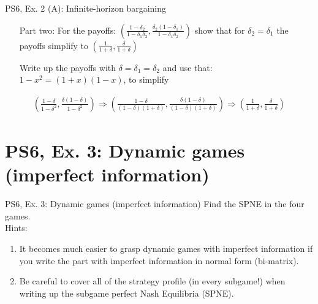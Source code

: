 \begin{frame}{PS6, Ex. 2 (A): Infinite-horizon bargaining}
    \begin{itemize}
    \item[Part two:] For the payoffs: $ \left( \frac{1-\delta_2}{1-\delta_1\delta_2},\frac{\delta_2(1-\delta_1)}{1-\delta_1\delta_2}\right)$ show that for $\delta_2=\delta_1$ the payoffs simplify to $\left(\frac{1}{1+\delta},\frac{\delta}{1+\delta}\right)$
    \end{itemize}
    \vfill\null
    \begin{itemize}
    \item[]Write up the payoffs with $\delta=\delta_1=\delta_2$ and use that: $1-x^2=(1+x)(1-x)$, to simplify \\
    \end{itemize}
    \vfill\null
    \begin{align*}
\left(\frac{1-\delta}{1-\delta^2},\frac{\delta(1-\delta)}{1-\delta^2}\right) \Rightarrow \left(\frac{1-\delta}{(1-\delta)(1+\delta)},\frac{\delta(1-\delta)}{(1-\delta)(1+\delta)}\right) \Rightarrow \left(\frac{1}{1+\delta},\frac{\delta}{1+\delta}\right)
    \end{align*} 
    \vfill\null
\end{frame}

\section{PS6, Ex. 3: Dynamic games (imperfect information)}

\begin{frame}{PS6, Ex. 3: Dynamic games (imperfect information)}
    Find the SPNE in the four games.\\\bigskip
    Hints:
    \begin{enumerate}
      \item It becomes much easier to grasp dynamic games with imperfect information if you write the part with imperfect information in normal form (bi-matrix).
      \item Be careful to cover all of the strategy profile (in every subgame!) when writing up the subgame perfect Nash Equilibria (SPNE).
    \end{enumerate}
    \vfill\null
\end{frame}


